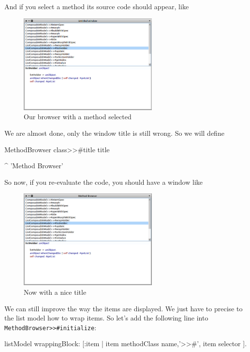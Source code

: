 \documentclass[a4paper,10pt,twoside]{book}
\begin{document}
And if you select a method its source code should appear, like 

\begin{figure}[ht]
\begin{center}
	\includegraphics[width=7cm]{MethodBrowser3}
	\caption{Our browser with a method selected}
\end{center}
\end{figure}

We are almost done, only the window title is still wrong.
So we will define
%
\begin{method}{MethodBrowser class>>\#title}
title

	^ 'Method Browser'
\end{method}

So now, if you re-evaluate the code, you should have a window like 

\begin{figure}[ht]
\begin{center}
	\includegraphics[width=7cm]{MethodBrowser4}
	\caption{Now with a nice title}
\end{center}
\end{figure}

We can still improve the way the items are displayed. We just have to precise to the list model how to wrap items.
So let's add the following line into \verb+MethodBrowser>>#initialize+:
\begin{code}{}
listModel wrappingBlock: [:item | item methodClass name,'>>#', item selector ].
\end{code}
\end{document}
